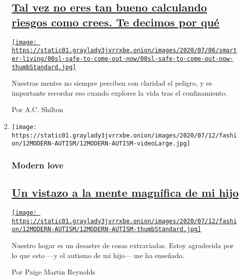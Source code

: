 \begin{enumerate}
\begin{enumerate}
    \hypertarget{tal-vez-no-eres-tan-bueno-calculando-riesgos-como-crees-te-decimos-por-quuxe9}{%
    \subsection{\texorpdfstring{\href{/es/2020/07/18/espanol/estilos-de-vida/como-evaluar-riesgo-sesgos.html}{Tal
    vez no eres tan bueno calculando riesgos como crees. Te decimos por
    qué}}{Tal vez no eres tan bueno calculando riesgos como crees. Te decimos por qué}}\label{tal-vez-no-eres-tan-bueno-calculando-riesgos-como-crees-te-decimos-por-quuxe9}}

    \href{/es/2020/07/18/espanol/estilos-de-vida/como-evaluar-riesgo-sesgos.html}{\texttt{[image: https://static01.graylady3jvrrxbe.onion/images/2020/07/06/smarter-living/00sl-safe-to-come-out-now/00sl-safe-to-come-out-now-thumbStandard.jpg]}}

    Nuestras mentes no siempre perciben con claridad el peligro, y es
    importante recordar eso cuando explores la vida tras el
    confinamiento.

    Por A.C. Shilton
  \item
    \texttt{[image: https://static01.graylady3jvrrxbe.onion/images/2020/07/12/fashion/12MODERN-AUTISM/12MODERN-AUTISM-videoLarge.jpg]}

    \hypertarget{modern-love}{%
    \subsubsection{Modern love}\label{modern-love}}

    \hypertarget{un-vistazo-a-la-mente-magnuxedfica-de-mi-hijo}{%
    \subsection{\texorpdfstring{\href{/es/2020/07/19/espanol/estilos-de-vida/amor-autismo-coronavirus.html}{Un
    vistazo a la mente magnífica de mi
    hijo}}{Un vistazo a la mente magnífica de mi hijo}}\label{un-vistazo-a-la-mente-magnuxedfica-de-mi-hijo}}

    \href{/es/2020/07/19/espanol/estilos-de-vida/amor-autismo-coronavirus.html}{\texttt{[image: https://static01.graylady3jvrrxbe.onion/images/2020/07/12/fashion/12MODERN-AUTISM/12MODERN-AUTISM-thumbStandard.jpg]}}

    Nuestro hogar es un desastre de cosas extraviadas. Estoy agradecida
    por lo que esto ---y el autismo de mi hijo--- me ha enseñado.

    Por Paige Martin Reynolds
  \end{enumerate}
\end{enumerate}

